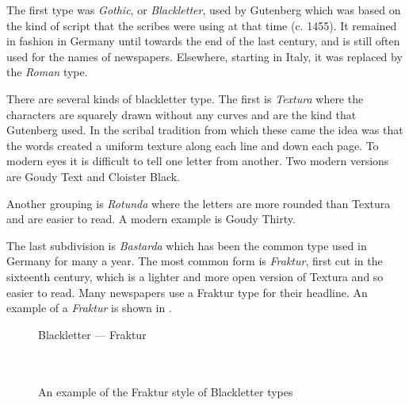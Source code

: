 \documentclass[10pt,a4paper,oneside,extrafontsizes]{memoir}%
\begin{document}
\begin{paracol}{2}
\switchEng
    The first type was \emph{Gothic}, or 
\emph{Blackletter}, used by 
Gutenberg which was based on
the kind of script that the scribes were using at that time (c. 1455). 
It remained in
fashion in Germany until towards the end of the last century, and is still
often used for the names of newspapers. Elsewhere, starting in Italy, 
it was replaced by the \emph{Roman} type. 

    There are several kinds of blackletter type. The first is 
\emph{Textura} where the characters are squarely 
drawn without any curves
and are the kind that Gutenberg used. 
In the scribal tradition from which these came the idea was that the words
created a uniform texture along each line and down each page. To modern eyes it
is difficult to tell one letter from another. Two modern versions are
Goudy Text and 
Cloister Black.

    Another grouping is \emph{Rotunda} where the letters are 
more rounded than Textura and are easier to read. A modern example is 
Goudy Thirty.

    The last subdivision is \emph{Bastarda} which has been
the common type used in Germany for many a year. The most common form
is \emph{Fraktur}, first cut in the sixteenth century, which
is a lighter and more open version of Textura and so easier
to read. Many newspapers use a Fraktur type for their headline. An
example of a \emph{Fraktur}
is shown in .%
\end{paracol}

\begin{figure}
\centering
{\centering{}\selectfont
  Blackletter --- Fraktur \\
  \UCalphabet \\
  \LCalphabet \\
  \fox\par}
\caption{An example of the Fraktur style of Blackletter types} \label{fig:fraktur}
\end{figure}
\end{document}
